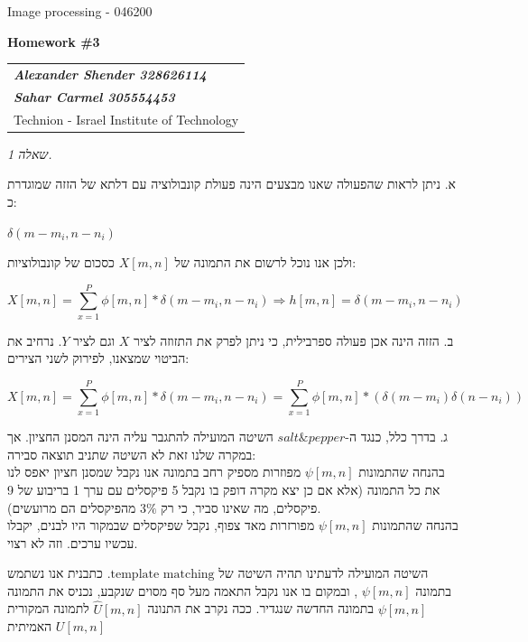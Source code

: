 \documentclass[a4paper]{iacas}
\begin{document}
\begin{center}
 \large Image processing - 046200
 \end{center}
\begin{center}
\large\textbf{Homework \#3}
 \end{center}


\begin{tabular}{l}
\\
{\bf\textit{Alexander Shender 328626114}} \\
{\bf\textit{Sahar Carmel 305554453}} \\
Technion - Israel Institute of Technology
\end{tabular}

\vspace{2em}

\newpage


\begin{hebrew}
\textit{\huge שאלה 1.}

א. ניתן לראות שהפעולה שאנו מבצעים הינה פעולת קונבולוציה עם דלתא של הזזה שמוגדרת כ: 
\end{hebrew}
$\delta(m-m_i,n-n_i)$
\begin{hebrew}
ולכן אנו נוכל לרשום את התמונה של $X[m,n]$ כסכום של קונבולוציות:
\end{hebrew}
$$X[m,n]  =\sum^P_{x=1}\phi[m,n]*\delta(m-m_i,n-n_i) \Longrightarrow h[m,n] = \delta(m-m_i,n-n_i)$$

\begin{hebrew}

ב. הזזה הינה אכן פעולה ספרבילית, כי ניתן לפרק את התזוזה לציר $X$ וגם לציר $Y$. נרחיב את הביטוי שמצאנו, לפירוק לשני הצירים:
\end{hebrew}
$$X[m,n]  =\sum^P_{x=1}\phi[m,n]*\delta(m-m_i,n-n_i) = \sum^P_{x=1}\phi[m,n]*(\delta(m-m_i)\delta(n-n_i))$$
\begin{hebrew}
ג. בדרך כלל, כנגד ה-$salt \& pepper$ השיטה המועילה להתגבר עליה הינה המסנן החציון. אך במקרה שלנו זאת לא השיטה שתניב תוצאה סבירה:
\\בהנחה שהתמונות $\psi[m,n]$ מפוזרות מספיק רחב בתמונה אנו נקבל שמסנן חציון יאפס לנו את כל התמונה (אלא אם כן יצא מקרה דופק בו נקבל 5 פיקסלים עם ערך 1 בריבוע של 9 פיקסלים, מה שאינו סביר, כי רק $3\%$ מהפיקסלים הם מרועשים).
\\בהנחה שהתמונות $\psi[m,n]$ מפורזרות מאד צפוף, נקבל שפיקסלים שבמקור היו לבנים, יקבלו עכשיו ערכים. וזה לא רצוי.
\end{hebrew}
\newline
\begin{hebrew}
השיטה המועילה לדעתינו תהיה השיטה של $\textrm{template matching}$. כתבנית אנו נשתמש בתמונה $\psi[m,n]$ , ובמקום בו אנו נקבל התאמה מעל סף מסוים שנקבע, נכניס את התמונה  $\psi[m,n]$ בתמונה החדשה שנגדיר. ככה נקרב את התנונה $\hat{U}[m,n]$ לתמונה המקורית האמיתית $U[m,n]$ 
\end{hebrew}
\end{document}
